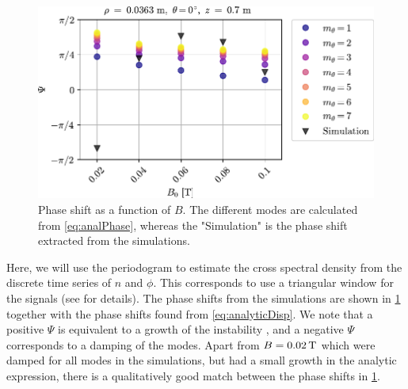 %
\begin{figure}[htb]
    \includegraphics{fig/results/growthRates/phaseShift}
    \caption{
        Phase shift as a function of $B$.
        The different modes are calculated from \cref{eq:analPhase}, whereas the "Simulation" is the phase shift extracted from the simulations.
    }
    \label{fig:phaseShift}
\end{figure}
%
Here, we will use the periodogram to estimate the cross spectral density from the discrete time series of $n$ and $\phi$.
This corresponds to use a triangular window for the signals (see \cite{Miller2004book} for details).
The phase shifts from the simulations are shown in \cref{fig:phaseShift} together with the phase shifts found from \cref{eq:analyticDisp}.
We note that a positive $\Psi$ is equivalent to a growth of the instability \cite{Garcia2001a}, and a negative $\Psi$ corresponds to a damping of the modes.
Apart from $B=0.02\, \text{T}$ which were damped for all modes in the simulations, but had a small growth in the analytic expression, there is a qualitatively good match between the phase shifts in \cref{fig:phaseShift}.

